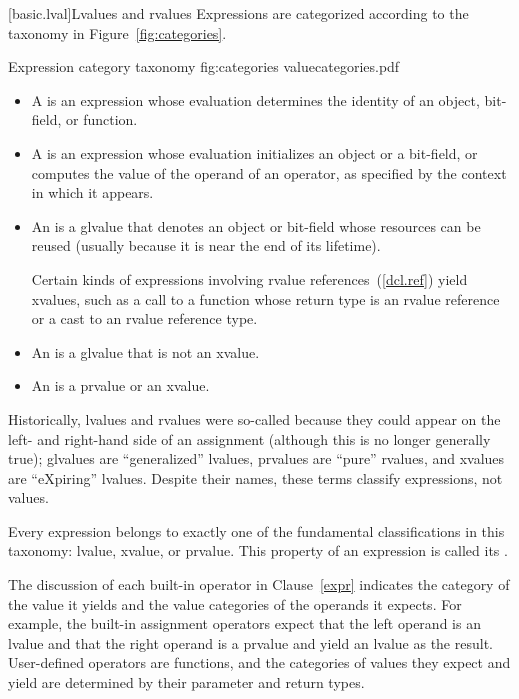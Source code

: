 [basic.lval]{Lvalues and rvalues}
\pnum
Expressions are categorized according to the taxonomy in Figure~\ref{fig:categories}.

\begin{importgraphic}
{Expression category taxonomy}
{fig:categories}
{valuecategories.pdf}
\end{importgraphic}

\begin{itemize}
\item A  is an expression whose evaluation determines the identity of an object, bit-field, or function.
\item A  is an expression whose evaluation initializes an object or a bit-field,
or computes the value of the operand of an operator,
as specified by the context in which it appears.
\item An  is a glvalue that denotes an object or bit-field whose resources can be reused (usually because it is near the end of its lifetime).
\begin{example}
Certain kinds of expressions involving rvalue references~(\ref{dcl.ref}) yield xvalues,
such as a call to a function whose return type is an rvalue reference
or a cast to an rvalue reference type.
\end{example}
\item An  is a glvalue that is not an xvalue.
\item An  is a prvalue or an xvalue.
\end{itemize}
\begin{note}
Historically, lvalues and rvalues were so-called
because they could appear on the left- and right-hand side of an assignment
(although this is no longer generally true);
glvalues are ``generalized'' lvalues,
prvalues are ``pure'' rvalues,
and xvalues are ``eXpiring'' lvalues.
Despite their names, these terms classify expressions, not values.
\end{note}
Every expression belongs to exactly one of the fundamental classifications in this
taxonomy: lvalue, xvalue, or prvalue. This property of an expression is called
its . \begin{note} The discussion of each built-in operator in
Clause~\ref{expr} indicates the category of the value it yields and the value categories
of the operands it expects. For example, the built-in assignment operators expect that
the left operand is an lvalue and that the right operand is a prvalue and yield an
lvalue as the result. User-defined operators are functions, and the categories of
values they expect and yield are determined by their parameter and return types. \end{note}

